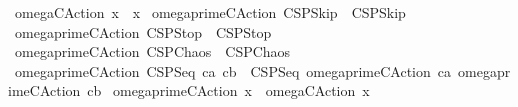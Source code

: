 \begin{isabellebody}
{\isacharbar}\ {\isachardoublequoteopen}omega{\isacharunderscore}CAction\ x\ {\isacharequal}\ x{\isachardoublequoteclose}\isanewline
{\isacharbar}\ {\isachardoublequoteopen}omega{\isacharunderscore}prime{\isacharunderscore}CAction\ CSPSkip\ {\isacharequal}\ CSPSkip{\isachardoublequoteclose}\isanewline
{\isacharbar}\ {\isachardoublequoteopen}omega{\isacharunderscore}prime{\isacharunderscore}CAction\ CSPStop\ {\isacharequal}\ CSPStop{\isachardoublequoteclose}\isanewline
{\isacharbar}\ {\isachardoublequoteopen}omega{\isacharunderscore}prime{\isacharunderscore}CAction\ CSPChaos\ {\isacharequal}\ CSPChaos{\isachardoublequoteclose}\isanewline
{\isacharbar}\ {\isachardoublequoteopen}omega{\isacharunderscore}prime{\isacharunderscore}CAction\ {\isacharparenleft}CSPSeq\ ca\ cb{\isacharparenright}\ {\isacharequal}\ {\isacharparenleft}CSPSeq\ {\isacharparenleft}omega{\isacharunderscore}prime{\isacharunderscore}CAction\ ca{\isacharparenright}\ {\isacharparenleft}omega{\isacharunderscore}prime{\isacharunderscore}CAction\ cb{\isacharparenright}{\isacharparenright}{\isachardoublequoteclose}\isanewline
{\isacharbar}\ {\isachardoublequoteopen}omega{\isacharunderscore}prime{\isacharunderscore}CAction\ x\ {\isacharequal}\ omega{\isacharunderscore}CAction\ x{\isachardoublequoteclose}\isanewline
\isanewline
%
\isadelimtheory
\isanewline
%
\endisadelimtheory
%
\isatagtheory
{}\isamarkupfalse%
%
\endisatagtheory
{\isafoldtheory}%
%
\isadelimtheory
%
\endisadelimtheory
\end{isabellebody}%
